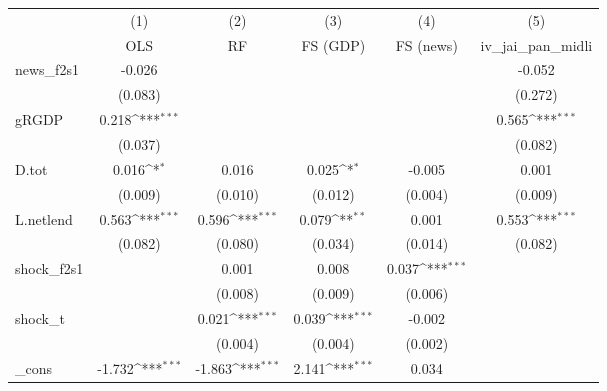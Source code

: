 {
\def\sym#1{\ifmmode^{#1}\else\(^{#1}\)\fi}
\begin{tabular}{l*{5}{c}}
\toprule
            &\multicolumn{1}{c}{(1)}&\multicolumn{1}{c}{(2)}&\multicolumn{1}{c}{(3)}&\multicolumn{1}{c}{(4)}&\multicolumn{1}{c}{(5)}\\
            &\multicolumn{1}{c}{OLS}&\multicolumn{1}{c}{RF}&\multicolumn{1}{c}{FS (GDP)}&\multicolumn{1}{c}{FS (news)}&\multicolumn{1}{c}{iv\_jai\_pan\_midli}\\
\midrule
news\_f2s1   &      -0.026         &                     &                     &                     &      -0.052         \\
            &     (0.083)         &                     &                     &                     &     (0.272)         \\
\addlinespace
gRGDP       &       0.218\sym{***}&                     &                     &                     &       0.565\sym{***}\\
            &     (0.037)         &                     &                     &                     &     (0.082)         \\
\addlinespace
D.tot       &       0.016\sym{*}  &       0.016         &       0.025\sym{*}  &      -0.005         &       0.001         \\
            &     (0.009)         &     (0.010)         &     (0.012)         &     (0.004)         &     (0.009)         \\
\addlinespace
L.netlend   &       0.563\sym{***}&       0.596\sym{***}&       0.079\sym{**} &       0.001         &       0.553\sym{***}\\
            &     (0.082)         &     (0.080)         &     (0.034)         &     (0.014)         &     (0.082)         \\
\addlinespace
shock\_f2s1  &                     &       0.001         &       0.008         &       0.037\sym{***}&                     \\
            &                     &     (0.008)         &     (0.009)         &     (0.006)         &                     \\
\addlinespace
shock\_t     &                     &       0.021\sym{***}&       0.039\sym{***}&      -0.002         &                     \\
            &                     &     (0.004)         &     (0.004)         &     (0.002)         &                     \\
\addlinespace
\_cons      &      -1.732\sym{***}&      -1.863\sym{***}&       2.141\sym{***}&       0.034         &                     \\

\end{tabular}}
